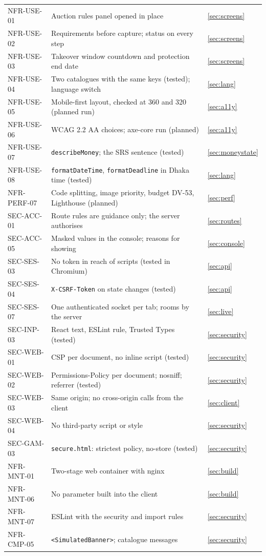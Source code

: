 \documentclass[11pt,a4paper]{article}
\begin{document}
{\begin{longtable}{@{}>{\ttfamily}p{2.4cm}>{\raggedright\arraybackslash}p{10.6cm}>{\raggedright\arraybackslash}p{2.2cm}@{}}
NFR-USE-01 & Auction rules panel opened in place & \ref{sec:screens} \\
NFR-USE-02 & Requirements before capture; status on every step & \ref{sec:screens} \\
NFR-USE-03 & Takeover window countdown and protection end date & \ref{sec:screens} \\
NFR-USE-04 & Two catalogues with the same keys (tested); language switch & \ref{sec:lang} \\
NFR-USE-05 & Mobile-first layout, checked at 360 and 320 (planned run) & \ref{sec:a11y} \\
NFR-USE-06 & WCAG 2.2 AA choices; axe-core run (planned) & \ref{sec:a11y} \\
NFR-USE-07 & \texttt{describeMoney}; the SRS sentence (tested) & \ref{sec:moneystate} \\
NFR-USE-08 & \texttt{formatDateTime}, \texttt{formatDeadline} in Dhaka time (tested) & \ref{sec:lang} \\
NFR-PERF-07 & Code splitting, image priority, budget DV-53, Lighthouse (planned) & \ref{sec:perf} \\
SEC-ACC-01 & Route rules are guidance only; the server authorises & \ref{sec:routes} \\
SEC-ACC-05 & Masked values in the console; reasons for showing & \ref{sec:console} \\
SEC-SES-03 & No token in reach of scripts (tested in Chromium) & \ref{sec:api} \\
SEC-SES-04 & \texttt{X-CSRF-Token} on state changes (tested) & \ref{sec:api} \\
SEC-SES-07 & One authenticated socket per tab; rooms by the server & \ref{sec:live} \\
SEC-INP-03 & React text, ESLint rule, Trusted Types (tested) & \ref{sec:security} \\
SEC-WEB-01 & CSP per document, no inline script (tested) & \ref{sec:security} \\
SEC-WEB-02 & Permissions-Policy per document; nosniff; referrer (tested) & \ref{sec:security} \\
SEC-WEB-03 & Same origin; no cross-origin calls from the client & \ref{sec:client} \\
SEC-WEB-04 & No third-party script or style & \ref{sec:security} \\
SEC-GAM-03 & \texttt{secure.html}: strictest policy, no-store (tested) & \ref{sec:security} \\
NFR-MNT-01 & Two-stage web container with nginx & \ref{sec:build} \\
NFR-MNT-06 & No parameter built into the client & \ref{sec:build} \\
NFR-MNT-07 & ESLint with the security and import rules & \ref{sec:security} \\
NFR-CMP-05 & \texttt{<SimulatedBanner>}; catalogue messages & \ref{sec:security} \\
\bottomrule
\end{longtable}}
\end{document}
